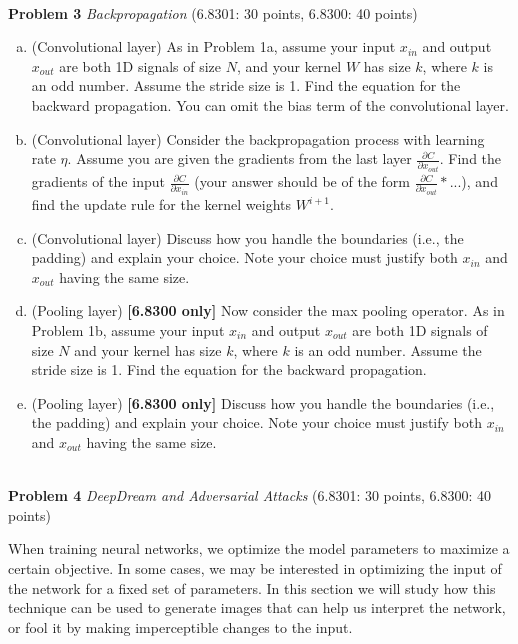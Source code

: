 \documentclass[11pt]{article}
\newcommand{\hwproblem}[2] {\noindent \\ {\bf #1} {\it #2}}
\begin{document}
\hwproblem{Problem 3}{Backpropagation} (6.8301: 30 points, 6.8300: 40 points)
\vspace{-0.5em}
\begin{enumerate}[(a)]
  \item (Convolutional layer) As in Problem 1a, assume your input $x_{in}$ and output $x_{out}$ are both 1D signals of size $N$, and your kernel $W$ has size $k$, where $k$ is an odd number. Assume the stride size is 1. Find the equation for the backward propagation. You can omit the bias term of the convolutional layer.

  \item (Convolutional layer) Consider the backpropagation process with learning rate $\eta$. Assume you are given the gradients from the last layer $\frac{\partial C}{\partial x_{out}}$. Find the gradients of the input $\frac{\partial C}{\partial x_{in}}$ (your answer should be of the form $\frac{\partial C}{\partial x_{out}} * ...$), and find the update rule for the kernel weights $W^{i+1}$.
  
  \item (Convolutional layer) Discuss how you handle the boundaries (i.e., the padding) and explain your choice. Note your choice must justify both $x_{in}$ and $x_{out}$ having the same size.
  
  \item (Pooling layer) \textbf{[6.8300 only]} Now consider the max pooling operator. As in Problem 1b, assume your input $x_{in}$ and output $x_{out}$ are both 1D signals of size $N$ and your kernel has size $k$, where $k$ is an odd number. Assume the stride size is 1. Find the equation for the backward propagation.
   
  \item (Pooling layer) \textbf{[6.8300 only]}  Discuss how you handle the boundaries (i.e., the padding) and explain your choice. Note your choice must justify both $x_{in}$ and $x_{out}$ having the same size.
  
\end{enumerate}

\hwproblem{Problem 4}{DeepDream and Adversarial Attacks} (6.8301: 30 points, 6.8300: 40 points)

When  training  neural  networks,  we  optimize  the  model  parameters  to  maximize  a  certain objective.  In some cases, we may be interested in optimizing the input of the network for a fixed set of parameters.  In this section we will study how this technique can be used to generate images that can help us interpret the network, or fool it by making imperceptible changes to the input.
\end{document}
